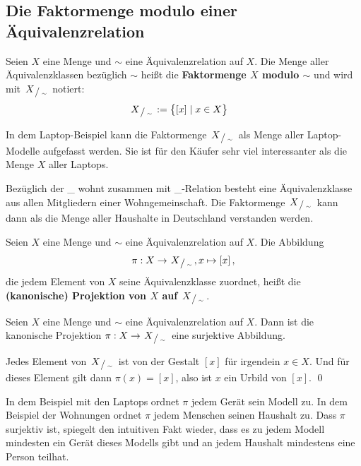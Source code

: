 \subsection{Die Faktormenge modulo einer Äquivalenzrelation}
\begin{de}[Faktormenge]
	Seien $X$ eine Menge und $\sim$ eine Äquivalenzrelation auf $X$. Die Menge aller Äquivalenzklassen bezüglich $\sim$ heißt die \textbf{Faktormenge $X$ modulo $\sim$} und wird mit $\sfrac{X}{\sim}$ notiert:
	\begin{align*}
		\sfrac{X}{\sim} & := \big\{ [x] \mid x\in X \big\} 
	\end{align*}
\end{de}

\begin{bsp}
	In dem Laptop-Beispiel kann die Faktormenge $\sfrac{X}{\sim}$ als Menge aller Laptop-Modelle aufgefasst werden. Sie ist für den Käufer sehr viel interessanter als die Menge $X$ aller Laptops.
\end{bsp}

\begin{bsp}
	Bezüglich der \glqq\_ wohnt zusammen mit \_\grqq-Relation besteht eine Äquivalenzklasse aus allen Mitgliedern einer Wohngemeinschaft. Die Faktormenge $\sfrac{X}{\sim}$ kann dann als die Menge aller Haushalte in Deutschland verstanden werden.
\end{bsp}






\begin{de}
	Seien $X$ eine Menge und $\sim$ eine Äquivalenzrelation auf $X$. Die Abbildung
	\[ \pi: X \to \sfrac{X}{\sim}, x \mapsto [x] \,,\]
die jedem Element von $X$ seine Äquivalenzklasse zuordnet, heißt die \textbf{(kanonische) Projektion von $X$ auf $\sfrac{X}{\sim}$}.
\end{de}


\begin{bem}
Seien $X$ eine Menge und $\sim$ eine Äquivalenzrelation auf $X$. Dann ist die kanonische Projektion $\pi : X \to  \sfrac{X}{\sim}$ eine surjektive Abbildung. 
\end{bem}
\begin{bew}
Jedes Element von $\sfrac{X}{\sim}$ ist von der Gestalt $[x]$ für irgendein $x\in X$. Und für dieses Element gilt dann $\pi(x)=[x]$, also ist $x$ ein Urbild von $[x]$. \qed
\end{bew}

\begin{bsp}
	In dem Beispiel mit den Laptops ordnet $\pi$ jedem Gerät sein Modell zu. In dem Beispiel der Wohnungen ordnet $\pi$ jedem Menschen seinen Haushalt zu. Dass $\pi$ surjektiv ist, spiegelt den intuitiven Fakt wieder, dass es zu jedem Modell mindesten ein Gerät dieses Modells gibt und an jedem Haushalt mindestens eine Person teilhat.
\end{bsp}




